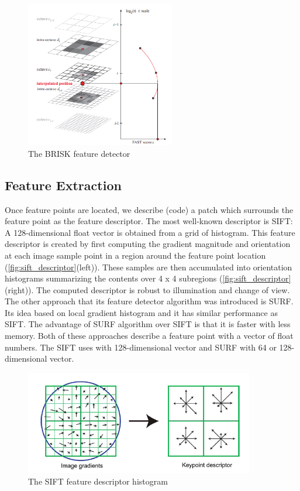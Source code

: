 \begin{figure}[H]
  \centering
  \includegraphics[width=65mm]{figures/brisk_detector}
  \caption{The BRISK feature detector}\label{fig:brisk_detector}
\end{figure}

\subsection{Feature Extraction} \label{subsec:feature_extraction}
Once feature points are located, we describe (code) a patch which surrounds the feature point as the feature descriptor. The most well-known descriptor is SIFT: A 128-dimensional float vector is obtained from a grid of histogram. This feature descriptor is created by first computing the gradient magnitude and orientation at each image sample point in a region around the feature point location (\autoref{fig:sift_descriptor}(left)). These samples are then accumulated into orientation histograms summarizing the contents over 4 x 4 subregions (\autoref{fig:sift_descriptor}(right)). The computed descriptor is robust to illumination and change of view. The other approach that its feature detector algorithm was introduced is SURF. Its idea based on local gradient histogram and it has similar performance as SIFT. The advantage of SURF algorithm over SIFT is that it is faster with less memory. Both of these approaches describe a feature point with a vector of float numbers. The SIFT uses with 128-dimensional vector and SURF with 64 or 128-dimensional vector.

\begin{figure}[H]
  \centering
  \includegraphics[width=100mm]{figures/sift_descriptor}
  \caption{The SIFT feature descriptor histogram}\label{fig:sift_descriptor}
\end{figure}

